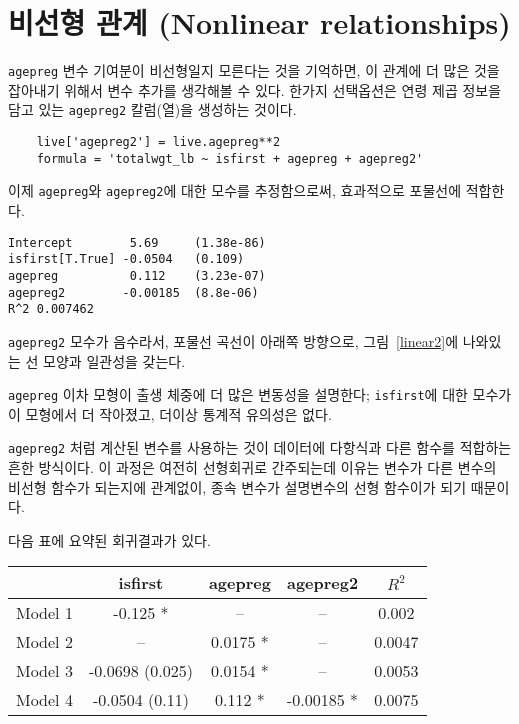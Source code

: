 

\section{비선형 관계 (Nonlinear relationships)}
\label{nonlinear}

{\tt agepreg} 변수 기여분이 비선형일지 모른다는 것을 기억하면,
이 관계에 더 많은 것을 잡아내기 위해서 변수 추가를 생각해볼 수 있다.
한가지 선택옵션은 연령 제곱 정보을 담고 있는 {\tt agepreg2} 칼럼(열)을 생성하는 것이다.

\begin{verbatim}
    live['agepreg2'] = live.agepreg**2
    formula = 'totalwgt_lb ~ isfirst + agepreg + agepreg2'
\end{verbatim}

이제 {\tt agepreg}와 {\tt agepreg2}에 대한 모수를 추정함으로써,
효과적으로 포물선에 적합한다.

\begin{verbatim}
Intercept        5.69     (1.38e-86)
isfirst[T.True] -0.0504   (0.109)
agepreg          0.112    (3.23e-07)
agepreg2        -0.00185  (8.8e-06)
R^2 0.007462
\end{verbatim}

{\tt agepreg2} 모수가 음수라서, 포물선 곡선이 아래쪽 방향으로,
그림~\ref{linear2}에 나와있는 선 모양과 일관성을 갖는다.

{\tt agepreg} 이차 모형이 출생 체중에 더 많은 변동성을 설명한다;
{\tt isfirst}에 대한 모수가 이 모형에서 더 작아졌고, 더이상 통계적 유의성은 없다.

{\tt agepreg2} 처럼 계산된 변수를 사용하는 것이 데이터에 다항식과 다른 함수를 적합하는 흔한 방식이다.
이 과정은 여전히 선형회귀로 간주되는데 이유는 
변수가 다른 변수의 비선형 함수가 되는지에 관계없이, 종속 변수가 설명변수의 선형 함수이가 되기 때문이다.

다음 표에 요약된 회귀결과가 있다.

\begin{center}
\begin{tabular}{|l|c|c|c|c|}
\hline & isfirst & agepreg & agepreg2 & $R^2$ \\ \hline
Model 1 & -0.125 * & -- & -- & 0.002 \\
Model 2 & -- & 0.0175 * & -- & 0.0047 \\
Model 3 & -0.0698 (0.025) & 0.0154 * & -- & 0.0053 \\
Model 4 & -0.0504 (0.11) & 0.112 * & -0.00185 * & 0.0075 \\
\hline
\end{tabular}
\end{center}

